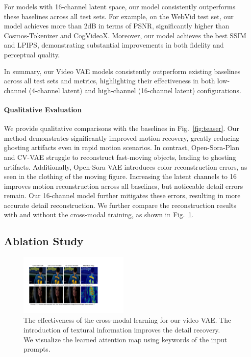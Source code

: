 For models with 16-channel latent space, our model consistently outperforms these baselines across all test sets. 
For example, on the WebVid test set, our model achieves more than 2dB in terms of PSNR, significantly higher than Cosmos-Tokenizer and CogVideoX. Moreover, our model achieves the best SSIM and LPIPS, demonstrating substantial improvements in both fidelity and perceptual quality.


In summary, our Video VAE models consistently outperform existing baselines across all test sets and metrics, highlighting their effectiveness in both low-channel (4-channel latent) and high-channel (16-channel latent) configurations.


\paragraph{Qualitative Evaluation}
We provide qualitative comparisons with the baselines in Fig.~\ref{fig:teaser}. Our method demonstrates significantly improved motion recovery, greatly reducing ghosting artifacts even in rapid motion scenarios. In contrast, Open-Sora-Plan and CV-VAE struggle to reconstruct fast-moving objects, leading to ghosting artifacts. Additionally, Open-Sora VAE introduces color reconstruction errors, as seen in the clothing of the moving figure. Increasing the latent channels to 16 improves motion reconstruction across all baselines, but noticeable detail errors remain. Our 16-channel model further mitigates these errors, resulting in more accurate detail reconstruction.
We further compare the reconstruction results with and without the cross-modal training, as shown in Fig.~\ref{fig:cross}.



\subsection{Ablation Study}



\begin{figure}[t]
\centering
\includegraphics[width=0.48\textwidth]{images/crossattn.pdf}
\caption{The effectiveness of the cross-modal learning for our video VAE. The introduction of textural information improves the detail recovery. We visualize the learned attention map using keywords of the input prompts. 
}
\label{fig:cross}
\vspace{-3mm}
\end{figure}

